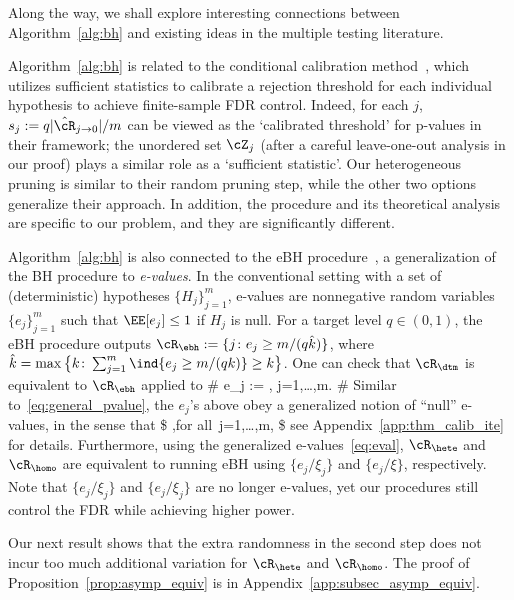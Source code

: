 Along the way, we shall explore interesting connections between Algorithm~\ref{alg:bh}
and existing ideas in the multiple testing literature.

\begin{remark}\normalfont
Algorithm~\ref{alg:bh} is related to the
conditional calibration method~\cite{fithian2020conditional},
which utilizes sufficient statistics to calibrate a
rejection threshold  for each individual hypothesis
to achieve finite-sample FDR control.
Indeed, for each $j$,
$s_j:= {q|\hat{\cR}_{j\to 0}  | }/{m}$
can be viewed as the `calibrated threshold' for p-values in their framework;
the unordered set $\cZ_j$ (after a careful leave-one-out analysis
in our proof)
plays a similar role as a `sufficient statistic'.
Our heterogeneous pruning is similar to their random pruning step,
while the other two options generalize their approach.
In addition, the procedure and its theoretical analysis
are specific to our problem, and they are significantly different.
\end{remark}


\begin{remark}\normalfont
Algorithm~\ref{alg:bh} is also connected to
the eBH procedure~\cite{wang2020false}, a generalization of
the BH procedure to {\em e-values}.
In the conventional setting with
a set of (deterministic) hypotheses $\{H_j\}_{j=1}^m$,
e-values are nonnegative random variables $\{e_j\}_{j=1}^m$
such that $\EE[e_j]\leq 1$
if $H_j$ is null.
For a target level $q\in(0,1)$,
the eBH procedure outputs
$\cR_{\ebh}:=\{j\colon e_j \geq m/(q\hat{k})\}$, where
$\hat{k} =\max\big\{k\colon \sum_{j=1}^m \ind\{e_j\geq m/(qk)\}\geq k\big\}$.
One can check that $\cR_{\dtm}$ is
equivalent to $\cR_{\ebh}$ applied to
\#\label{eq:eval}
e_j := ,
\quad j=1,\dots,m.
\#
Similar to~\eqref{eq:general_pvalue},
the $e_j$'s above obey a generalized notion of ``null'' e-values, in the sense that
\$
\EE{},\quad \textrm{for all}~j=1,\dots,m,
\$
see Appendix~\ref{app:thm_calib_ite} for details.
Furthermore, using the generalized e-values~\eqref{eq:eval},
$\cR_\hete$ and $\cR_\homo$ are equivalent to running eBH
using $\{e_j/\xi_j\}$ and $\{e_j/\xi\}$, respectively.
Note that $\{e_j/\xi_j\}$ and $\{e_j/\xi_j\}$ are no longer
e-values, yet our procedures still control the FDR while achieving higher power.
\end{remark}


Our next result shows that the
extra randomness in the second step
does not incur too much additional variation for $\cR_\hete$ and $\cR_\homo$.
The proof of Proposition~\ref{prop:asymp_equiv} is in Appendix~\ref{app:subsec_asymp_equiv}.


